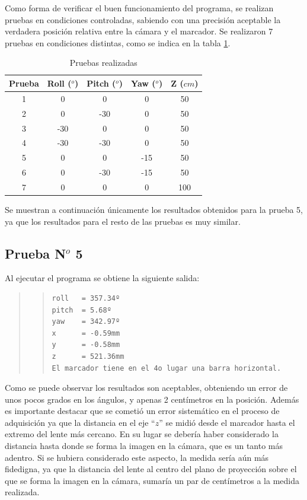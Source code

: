 \documentclass[main]{subfiles}
\begin{document}
Como forma de verificar el buen funcionamiento del programa, se realizan pruebas en condiciones controladas, sabiendo con una precisión aceptable la verdadera posición relativa entre la cámara y el marcador. Se realizaron 7 pruebas en condiciones distintas, como se indica en la tabla \ref{tab:pruebas}.
\begin{table}[H]
\centering
\begin{tabular}{|c|c|c|c|c|} 
\hline \cellcolor[gray]{0.8} \textbf{Prueba} & \cellcolor[gray]{0.8} \textbf{Roll ($^o$)} & \cellcolor[gray]{0.8} \textbf{Pitch ($^o$)} & \cellcolor[gray]{0.8} \textbf{Yaw ($^o$)} & \cellcolor[gray]{0.8} \textbf{Z ($cm$)}\\ 
\hline 1 & 0   & 0   & 0   & 50 \\ 
\hline 2 & 0   & -30 & 0   & 50 \\ 
\hline 3 & -30 & 0   & 0   & 50 \\ 
\hline 4 & -30 & -30 & 0   & 50 \\ 
\hline 5 & 0   & 0   & -15 & 50 \\ 
\hline 6 & 0   & -30 & -15 & 50 \\ 
\hline 7 & 0   & 0   & 0   & 100 \\
\hline
\end{tabular} 
\caption{Pruebas realizadas}
\label{tab:pruebas}
\end{table}

Se muestran a continuación únicamente los resultados obtenidos para la prueba 5, ya que los resultados para el resto de las pruebas es muy similar.

\subsection{Prueba N$^o$ 5}

Al ejecutar el programa se obtiene la siguiente salida:

\begin{quote}
\begin{quote}
\begin{verbatim}
roll   = 357.34º
pitch  = 5.68º
yaw    = 342.97º
x      = -0.59mm
y      = -0.58mm
z      = 521.36mm
El marcador tiene en el 4o lugar una barra horizontal.
\end{verbatim}
\end{quote}
\end{quote}

Como se puede observar los resultados son aceptables, obteniendo un error de unos pocos grados en los ángulos, y apenas 2 centímetros en la posición. Además es importante destacar que se cometió un error sistemático en el proceso de adquisición ya que la distancia en el eje ``$z$'' se midió desde el marcador hasta el extremo del lente más cercano. En su lugar se debería haber considerado la distancia hasta donde se forma la imagen en la cámara, que es un tanto más adentro. Si se hubiera considerado este aspecto, la medida sería aún más fidedigna, ya que la distancia del lente al centro del plano de proyección sobre el que se forma la imagen en la cámara, sumaría un par de centímetros a la medida realizada.
\end{document}
